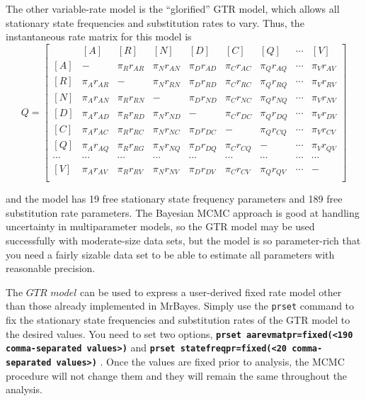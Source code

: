 \documentclass[12pt]{book}
\newcommand{\ttt}[1]{\texttt{#1} }
\newcommand{\tb}[1]{\texttt{\textbf{#1}} }
\begin{document}
The other variable-rate model is the ``glorified'' GTR model, which allows all stationary
state frequencies and substitution rates to vary. Thus, the instantaneous rate matrix for
this model is
\[
Q=\begin{bmatrix}
    & [A] & [R] & [N] & [D] & [C] & [Q] & \cdots & [V]\\ 
 [A]& - & \pi_{R} r_{AR}& \pi_{N} r_{AN} & \pi_{D} r_{AD}& \pi_{C} r_{AC}& \pi_{Q} r_{AQ} & \cdots & \pi_V 
r_{AV}\\ 
 [R]& \pi_{A} r_{AR} &- &  \pi_{N}  r_{RN}& \pi_{D} r_{RD}& \pi_{C} r_{RC}& \pi_{Q} r_{RQ} & \cdots & \pi_V 
r_{RV}\\ 
 [N]& \pi_{A} r_{AN}&\pi_{R} r_{RN}&- &   \pi_{D} r_{ND}& \pi_{C} r_{NC}& \pi_{Q} r_{NQ} & \cdots & \pi_V 
r_{NV}\\ 
 [D]& \pi_{A} r_{AD} &\pi_{R} r_{RD} &  \pi_{N} r_{ND}&- &  \pi_{C} r_{DC}& \pi_{Q} r_{DQ} & \cdots & \pi_V 
r_{DV}\\ 
 [C]& \pi_{A} r_{AC} &\pi_{R} r_{RC} &  \pi_{N} r_{NC}&  \pi_{D} r_{DC}&- & \pi_{Q} r_{CQ} & \cdots & \pi_V 
r_{CV}\\ 
 [Q]& \pi_{A} r_{AQ} &\pi_{R} r_{RG} &  \pi_{N} r_{NQ}&  \pi_{D} r_{DQ}& \pi_{C} r_{CQ} &- & \cdots & \pi_V 
r_{QV}\\  
 \cdots& \cdots& \cdots& \cdots& \cdots& \cdots& \cdots& \cdots& \cdots\\
 [V]& \pi_{A} r_{AV} &\pi_{R} r_{RV} &  \pi_{N} r_{NV}&  \pi_{D} r_{DV}& \pi_{C} r_{CV} &\pi_Q r_{QV}& 
\cdots &- \\ 
\end{bmatrix}
\]

and the model has 19 free stationary state frequency parameters and 189 free substitution
rate parameters. The Bayesian MCMC approach is good at handling uncertainty in multiparameter
models, so the GTR model may be used successfully with moderate-size data
sets, but the model is so parameter-rich that you need a fairly sizable data set to be able to
estimate all parameters with reasonable precision.

The $GTR$ $model$ can be used to express a user-derived fixed rate model other than those
already implemented in MrBayes. Simply use the \ttt{prset} command to fix the stationary
state frequencies and substitution rates of the GTR model to the desired values. You need
to set two options, \tb{prset aarevmatpr=fixed(<190 comma-separated
values>)} and \tb{prset statefreqpr=fixed(<20 comma-separated
values>)}. Once the values are fixed prior to analysis, the MCMC procedure will not
change them and they will remain the same throughout the analysis.
\end{document}
